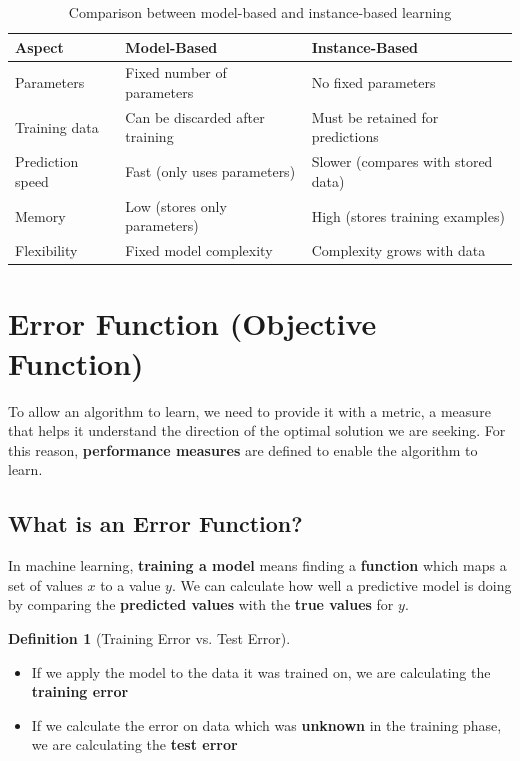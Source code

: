 \documentclass[11pt,a4paper]{article}
\theoremstyle{definition}
\newtheorem{definition}{Definition}[section]
\theoremstyle{plain}
\theoremstyle{remark}
\begin{document}
\begin{table}[h]
\centering
\begin{tabular}{|l|p{5.5cm}|p{5.5cm}|}
\hline
\textbf{Aspect} & \textbf{Model-Based} & \textbf{Instance-Based} \\
\hline
Parameters & Fixed number of parameters & No fixed parameters \\
\hline
Training data & Can be discarded after training & Must be retained for predictions \\
\hline
Prediction speed & Fast (only uses parameters) & Slower (compares with stored data) \\
\hline
Memory & Low (stores only parameters) & High (stores training examples) \\
\hline
Flexibility & Fixed model complexity & Complexity grows with data \\
\hline
\end{tabular}
\caption{Comparison between model-based and instance-based learning}
\end{table}

\section{Error Function (Objective Function)}

To allow an algorithm to learn, we need to provide it with a metric, a measure that helps it understand the direction of the optimal solution we are seeking. For this reason, \textbf{performance measures} are defined to enable the algorithm to learn.

\subsection{What is an Error Function?}

In machine learning, \textbf{training a model} means finding a \textbf{function} which maps a set of values $x$ to a value $y$. We can calculate how well a predictive model is doing by comparing the \textbf{predicted values} with the \textbf{true values} for $y$.

\begin{definition}[Training Error vs. Test Error]
\begin{itemize}
    \item If we apply the model to the data it was trained on, we are calculating the \textbf{training error}
    \item If we calculate the error on data which was \textbf{unknown} in the training phase, we are calculating the \textbf{test error}
\end{itemize}
\end{definition}
\end{document}
